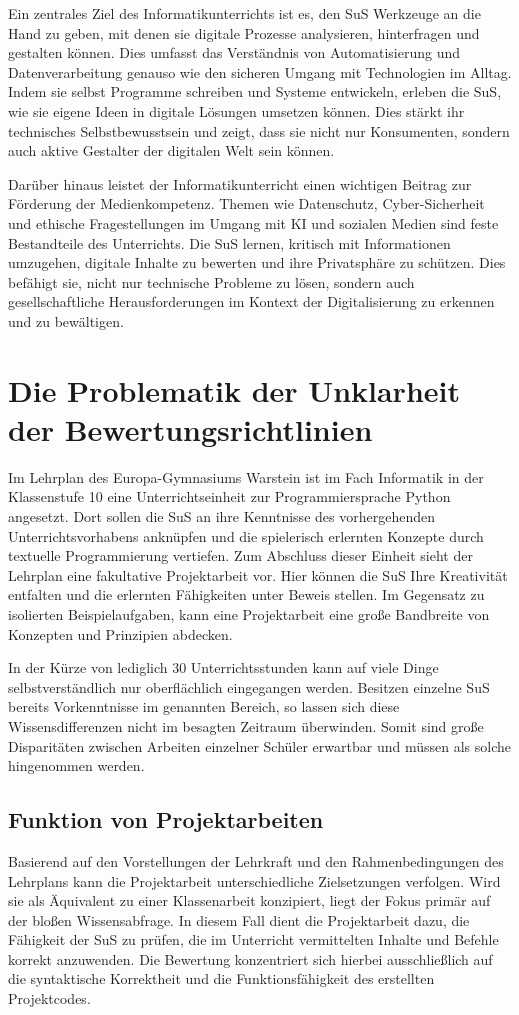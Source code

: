 \documentclass[a4paper,12pt]{article}
\begin{document}
Ein zentrales Ziel des Informatikunterrichts ist es, den SuS Werkzeuge an die Hand zu geben, mit denen sie digitale Prozesse analysieren, hinterfragen und gestalten können. Dies umfasst das Verständnis von Automatisierung und Datenverarbeitung genauso wie den sicheren Umgang mit Technologien im Alltag. Indem sie selbst Programme schreiben und Systeme entwickeln, erleben die SuS, wie sie eigene Ideen in digitale Lösungen umsetzen können. Dies stärkt ihr technisches Selbstbewusstsein und zeigt, dass sie nicht nur Konsumenten, sondern auch aktive Gestalter der digitalen Welt sein können.

Darüber hinaus leistet der Informatikunterricht einen wichtigen Beitrag zur Förderung der Medienkompetenz. Themen wie Datenschutz, Cyber-Sicherheit und ethische Fragestellungen im Umgang mit KI und sozialen Medien sind feste Bestandteile des Unterrichts. Die SuS lernen, kritisch mit Informationen umzugehen, digitale Inhalte zu bewerten und ihre Privatsphäre zu schützen. Dies befähigt sie, nicht nur technische Probleme zu lösen, sondern auch gesellschaftliche Herausforderungen im Kontext der Digitalisierung zu erkennen und zu bewältigen.


\section{Die Problematik der Unklarheit der Bewertungsrichtlinien}
Im Lehrplan des Europa-Gymnasiums Warstein ist im Fach Informatik in der Klassenstufe 10 eine Unterrichtseinheit zur Programmiersprache Python angesetzt. Dort sollen die SuS an ihre Kenntnisse des vorhergehenden Unterrichtsvorhabens anknüpfen und die spielerisch erlernten Konzepte durch textuelle Programmierung vertiefen. Zum Abschluss dieser Einheit sieht der Lehrplan eine fakultative Projektarbeit vor. Hier können die SuS Ihre Kreativität entfalten und die erlernten Fähigkeiten unter Beweis stellen. Im Gegensatz zu isolierten Beispielaufgaben, kann eine Projektarbeit eine große Bandbreite von Konzepten und Prinzipien abdecken.

In der Kürze von lediglich 30 Unterrichtsstunden kann auf viele Dinge selbstverständlich nur oberflächlich eingegangen werden. Besitzen einzelne SuS bereits Vorkenntnisse im genannten Bereich, so lassen sich diese Wissensdifferenzen nicht im besagten Zeitraum überwinden. Somit sind große Disparitäten zwischen Arbeiten einzelner Schüler erwartbar und müssen als solche hingenommen werden.


\subsection{Funktion von Projektarbeiten}
Basierend auf den Vorstellungen der Lehrkraft und den Rahmenbedingungen des Lehrplans kann die Projektarbeit unterschiedliche Zielsetzungen verfolgen. Wird sie als Äquivalent zu einer Klassenarbeit konzipiert, liegt der Fokus primär auf der bloßen Wissensabfrage. In diesem Fall dient die Projektarbeit dazu, die Fähigkeit der SuS zu prüfen, die im Unterricht vermittelten Inhalte und Befehle korrekt anzuwenden. Die Bewertung konzentriert sich hierbei ausschließlich auf die syntaktische Korrektheit und die Funktionsfähigkeit des erstellten Projektcodes.
\end{document}
